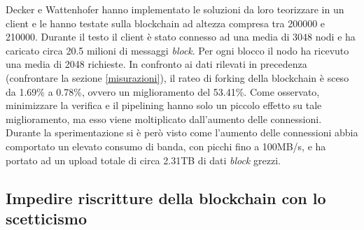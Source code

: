 Decker e Wattenhofer hanno implementato le soluzioni da loro teorizzare in un client e le hanno testate sulla blockchain ad altezza compresa tra 200000 e 210000. Durante il testo il client è stato connesso ad una media di 3048 nodi e ha caricato circa 20.5 milioni di messaggi \emph{block}. Per ogni blocco il nodo ha ricevuto una media di 2048 richieste.
In confronto ai dati rilevati in precedenza (confrontare la sezione \ref{misurazioni}), il rateo di forking della blockchain è sceso da 1.69\% a 0.78\%, ovvero un miglioramento del 53.41\%. Come osservato, minimizzare la verifica e il pipelining hanno solo un piccolo effetto su tale miglioramento, ma esso viene moltiplicato dall'aumento delle connessioni. Durante la sperimentazione si è però visto come l'aumento delle connessioni abbia comportato un elevato consumo di banda, con picchi fino a 100MB/s, e ha portato ad un upload totale di circa 2.31TB di dati \emph{block} grezzi.

\subsection{Impedire riscritture della blockchain con lo scetticismo}


